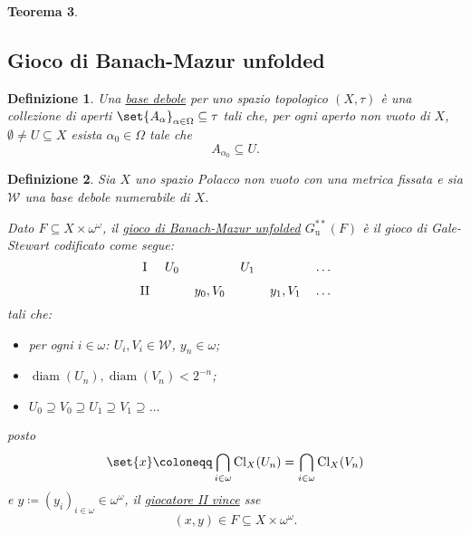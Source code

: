 \documentclass[titlepage]{article}
\newcommand{\1}{\mathds{1}}
\theoremstyle{definition}%
\newtheorem{thm}{Teorema}[section]
\theoremstyle{plain}
\newtheorem{defn}[thm]{Definizione}
\theoremstyle{remark}
\begin{document}
\begin{thm}
\subsection{Gioco di Banach-Mazur unfolded}
\label{sec:org8e1057c}

\begin{defn}
Una \uline{base debole} per uno spazio topologico \((X,\tau)\) è una collezione di aperti \(\set{A_{\alpha}}_{\alpha \in \Omega} \subseteq \tau\) tali che, per ogni aperto non vuoto di \(X\), \(\emptyset\neq U \subseteq X\) esista \(\alpha_{0} \in \Omega\) tale che
\begin{equation*}
A_{\alpha_{0}} \subseteq U.
\end{equation*}

\end{defn}

\begin{defn}
Sia \(X\) uno {spazio Polacco} non vuoto con una {metrica} fissata e sia \(\mathcal{W}\) una {base debole} {numerabile} di \(X\).

Dato \(F \subseteq X\times \omega^{\omega}\), il \uline{gioco di Banach-Mazur unfolded} \(G^{**}_{\text{u}}(F)\) è il {gioco} {di Gale-Stewart} codificato come segue:
\begin{equation*}
\begin{tikzcd}[ampersand replacement=\&,cramped,sep=tiny]
	{\text{I}} \& {U_0} \&\& {U_1} \&\& \dots \\
	{\text{II}} \&\& {y_0,V_0} \&\& {y_1, V_{1}} \& \dots
\end{tikzcd}
\end{equation*}
tali che:
\begin{itemize}
\item per ogni \(i \in \omega\): \(U_{i}, V_{i} \in \mathcal{W}\), \(y_{n} \in \omega\);
\item \(\operatorname{diam}(U_{n}), \operatorname{diam}(V_{n}) < 2^{-n}\);
\item \(U_{0}\supseteq V_{0}\supseteq U_{1}\supseteq V_{1}\supseteq \dots\)
\end{itemize}

posto
\begin{equation*}
\set{x}\coloneqq\bigcap_{i \in \omega} \operatorname{Cl}_{X}(U_{n}) = \bigcap_{i \in \omega} \operatorname{Cl}_{X}(V_{n})
\end{equation*}
e \(y\coloneqq (y_{i})_{i \in \omega} \in \omega^{\omega}\), il \uline{giocatore II vince} sse
\begin{equation*}
(x,y) \in F \subseteq X\times \omega^{\omega}.
\end{equation*}
\end{defn}


\end{thm}
\end{document}
